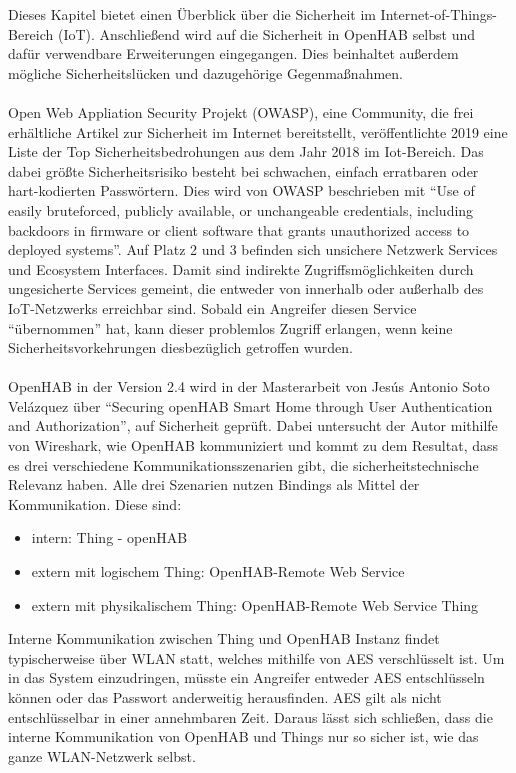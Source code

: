 Dieses Kapitel bietet einen Überblick über die Sicherheit im Internet-of-Things-Bereich (IoT).  Anschließend wird auf die Sicherheit in OpenHAB selbst und dafür verwendbare Erweiterungen eingegangen. Dies beinhaltet außerdem mögliche Sicherheitslücken und dazugehörige Gegenmaßnahmen.\\
\\
Open Web Appliation Security Projekt (OWASP), eine Community, die frei erhältliche Artikel zur Sicherheit im Internet bereitstellt, veröffentlichte 2019 eine Liste der Top Sicherheitsbedrohungen aus dem Jahr 2018 im Iot-Bereich.\cite{OWASP01:IOT} Das dabei größte Sicherheitsrisiko besteht bei schwachen, einfach erratbaren oder hart-kodierten Passwörtern. Dies wird von OWASP beschrieben mit "`Use of easily bruteforced, publicly available, or unchangeable credentials, including backdoors in firmware or client software that grants unauthorized access to deployed systems"'.\cite{OWASP01:IOT} Auf Platz 2 und 3 befinden sich unsichere Netzwerk Services und Ecosystem Interfaces. Damit sind indirekte Zugriffsmöglichkeiten durch ungesicherte Services gemeint, die entweder von innerhalb oder außerhalb des IoT-Netzwerks erreichbar sind. Sobald ein Angreifer diesen Service "`übernommen"' hat, kann dieser problemlos Zugriff erlangen, wenn keine Sicherheitsvorkehrungen diesbezüglich getroffen wurden.\\
\\
OpenHAB in der Version 2.4 wird in der Masterarbeit von Jesús Antonio Soto Velázquez über "`Securing openHAB Smart Home through User Authentication and Authorization"', auf Sicherheit geprüft.\cite{MA01:OPH} Dabei untersucht der Autor mithilfe von Wireshark, wie OpenHAB kommuniziert und kommt zu dem Resultat, dass es drei verschiedene Kommunikationsszenarien gibt, die sicherheitstechnische Relevanz haben. Alle drei Szenarien nutzen Bindings als Mittel der Kommunikation. Diese sind:
\begin{itemize}
	\item intern: Thing - openHAB
	\item extern mit logischem Thing: OpenHAB-Remote Web Service
	\item extern mit physikalischem Thing: OpenHAB-Remote Web Service Thing
\end{itemize}	
Interne Kommunikation zwischen Thing und OpenHAB Instanz findet typischerweise über WLAN statt, welches mithilfe von AES verschlüsselt ist. Um in das System einzudringen, müsste ein Angreifer entweder AES entschlüsseln können oder das Passwort anderweitig herausfinden. AES gilt als nicht entschlüsselbar in einer annehmbaren Zeit. Daraus lässt sich schließen, dass die interne Kommunikation von OpenHAB und Things nur so sicher ist, wie das ganze WLAN-Netzwerk selbst.\\
